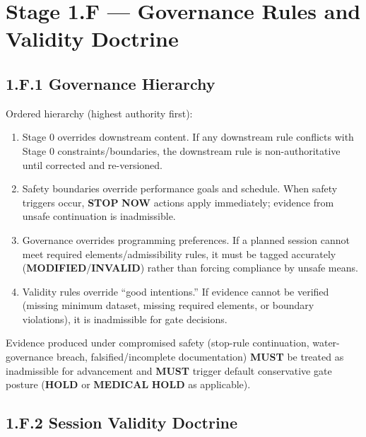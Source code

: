 \documentclass[10pt]{article}
\begin{document}
\section*{Stage 1.F — Governance Rules and Validity Doctrine}
{}

\subsection*{1.F.1 Governance Hierarchy}
{}

Ordered hierarchy (highest authority first):

\begin{enumerate}
\item Stage 0 overrides downstream content. If any downstream rule conflicts with Stage 0 constraints/boundaries, the downstream rule is non-authoritative until corrected and re-versioned.
\item Safety boundaries override performance goals and schedule. When safety triggers occur, \textbf{STOP} \textbf{NOW} actions apply immediately; evidence from unsafe continuation is inadmissible.
\item Governance overrides programming preferences. If a planned session cannot meet required elements/admissibility rules, it must be tagged accurately (\textbf{MODIFIED}/\textbf{INVALID}) rather than forcing compliance by unsafe means.
\item Validity rules override “good intentions.” If evidence cannot be verified (missing minimum dataset, missing required elements, or boundary violations), it is inadmissible for gate decisions.
\end{enumerate}

Evidence produced under compromised safety (stop-rule continuation, water-governance breach, falsified/incomplete documentation) \textbf{MUST} be treated as inadmissible for advancement and \textbf{MUST} trigger default conservative gate posture (\textbf{HOLD} or \textbf{MEDICAL} \textbf{HOLD} as applicable).

\newpage

\subsection*{1.F.2 Session Validity Doctrine}
{}
\end{document}
